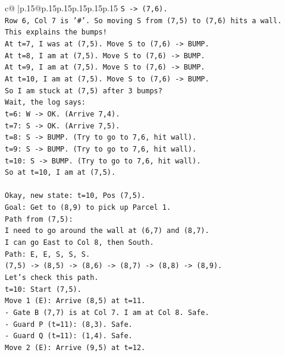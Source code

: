 \documentclass{article}
\begin{document}
{\begin{supertabular}{c@{$\;$}|p{.15\linewidth}@{}p{.15\linewidth}p{.15\linewidth}p{.15\linewidth}p{.15\linewidth}p{.15\linewidth}}
{{{\texttt{S {-}> (7,6).} \\
\texttt{Row 6, Col 7 is '\#'. So moving S from (7,5) to (7,6) hits a wall.} \\
\texttt{This explains the bumps!} \\
\texttt{At t=7, I was at (7,5). Move S to (7,6) {-}> BUMP.} \\
\texttt{At t=8, I am at (7,5). Move S to (7,6) {-}> BUMP.} \\
\texttt{At t=9, I am at (7,5). Move S to (7,6) {-}> BUMP.} \\
\texttt{At t=10, I am at (7,5). Move S to (7,6) {-}> BUMP.} \\
\texttt{So I am stuck at (7,5) after 3 bumps?} \\
\texttt{Wait, the log says:} \\
\texttt{t=6: W {-}> OK. (Arrive 7,4).} \\
\texttt{t=7: S {-}> OK. (Arrive 7,5).} \\
\texttt{t=8: S {-}> BUMP. (Try to go to 7,6, hit wall).} \\
\texttt{t=9: S {-}> BUMP. (Try to go to 7,6, hit wall).} \\
\texttt{t=10: S {-}> BUMP. (Try to go to 7,6, hit wall).} \\
\texttt{So at t=10, I am at (7,5).} \\
\\ 
\texttt{Okay, new state: t=10, Pos (7,5).} \\
\texttt{Goal: Get to (8,9) to pick up Parcel 1.} \\
\texttt{Path from (7,5):} \\
\texttt{I need to go around the wall at (6,7) and (8,7).} \\
\texttt{I can go East to Col 8, then South.} \\
\texttt{Path: E, E, S, S, S.} \\
\texttt{(7,5) {-}> (8,5) {-}> (8,6) {-}> (8,7) {-}> (8,8) {-}> (8,9).} \\
\texttt{Let's check this path.} \\
\texttt{t=10: Start (7,5).} \\
\texttt{Move 1 (E): Arrive (8,5) at t=11.} \\
\texttt{{-} Gate B (7,7) is at Col 7. I am at Col 8. Safe.} \\
\texttt{{-} Guard P (t=11): (8,3). Safe.} \\
\texttt{{-} Guard Q (t=11): (1,4). Safe.} \\
\texttt{Move 2 (E): Arrive (9,5) at t=12.} \\
}}}
\end{supertabular}}
\end{document}
